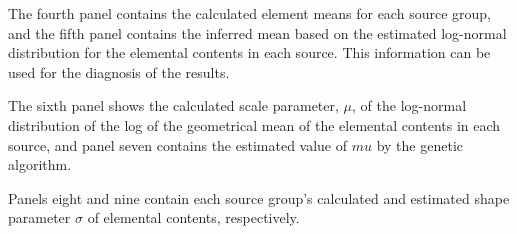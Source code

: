 \documentclass[12pt]{report}
\begin{document}
The fourth panel contains the calculated element means for each source group, and the fifth panel contains the inferred mean based on the estimated log-normal distribution for the elemental contents in each source. This information can be used for the diagnosis of the results. 

The sixth panel shows the calculated scale parameter, $\mu$, of the log-normal distribution of the log of the geometrical mean of the elemental contents in each source, and panel seven contains the estimated value of $mu$ by the genetic algorithm. 

Panels eight and nine contain each source group's calculated and estimated shape parameter $\sigma$ of elemental contents, respectively. 






\end{document}
